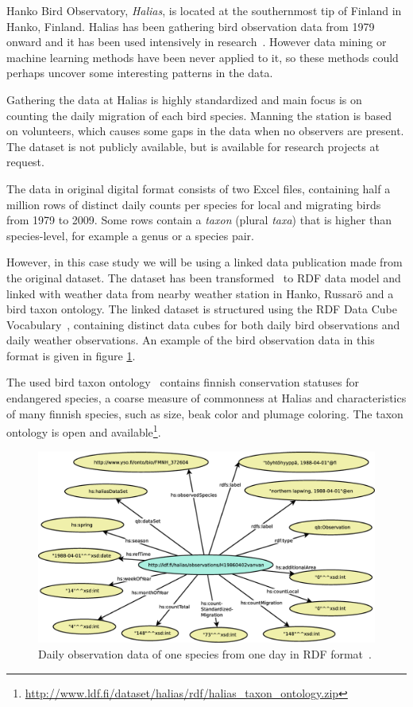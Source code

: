 \documentclass[english]{tktltiki2}
\begin{document}
Hanko Bird Observatory, \emph{Halias}, is located at the southernmost tip of Finland in Hanko, Finland. Halias has been gathering bird observation data from 1979 onward and it has been used intensively in research~\cite{HangonJulkaisut}. However data mining or machine learning methods have been never applied to it, so these methods could perhaps uncover some interesting patterns in the data.

Gathering the data at Halias is highly standardized and main focus is on counting the daily migration of each bird species. Manning the station is based on volunteers, which causes some gaps in the data when no observers are present.
The dataset is not publicly available, but is available for research projects at request.

The data in original digital format consists of two Excel files, containing half a million rows of distinct daily counts per species for local and migrating birds from 1979 to 2009. Some rows contain a \emph{taxon} (plural \emph{taxa}) that is higher than species-level, for example a genus or a species pair.

However, in this case study we will be using a linked data publication made from the original dataset. The dataset has been transformed~\cite{koho-hyvonen-orni-2014, koho2015gradu} to RDF data model and linked with weather data from nearby weather station in Hanko, Russarö and a bird taxon ontology.
The linked dataset is structured using the RDF Data Cube Vocabulary~\cite{w3crdfdatacube}, containing distinct data cubes for both daily bird observations and daily weather observations. An example of the bird observation data in this format is given in figure \ref{fig: havaintograafi}.

The used bird taxon ontology~\cite{koho2015gradu} contains finnish conservation statuses for endangered species, a coarse measure of commonness at Halias and characteristics of many finnish species, such as size, beak color and plumage coloring. The taxon ontology is open and available\footnote{\url{http://www.ldf.fi/dataset/halias/rdf/halias_taxon_ontology.zip}}.

\begin{figure}[htb]
\centering
\includegraphics[clip=true, width=\textwidth]{havaintograafi}
\caption{Daily observation data of one species from one day in RDF format~\cite{koho2015gradu}.}
\label{fig: havaintograafi}
\end{figure}
\end{document}
